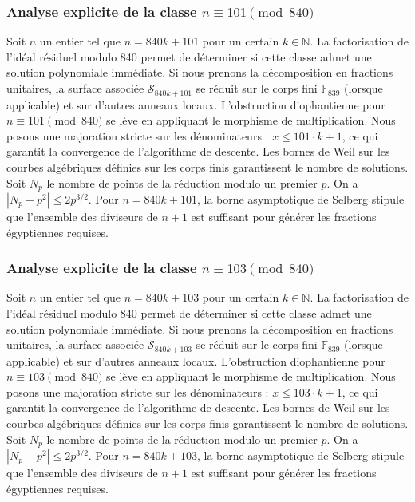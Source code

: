 \documentclass[11pt,a4paper]{article}
\begin{document}
\subsubsection{Analyse explicite de la classe $n \equiv 101 \pmod{840}$}
Soit $n$ un entier tel que $n = 840k + 101$ pour un certain $k \in \mathbb{N}$.
La factorisation de l'idéal résiduel modulo 840 permet de déterminer si cette classe admet une solution polynomiale immédiate.
Si nous prenons la décomposition en fractions unitaires, la surface associée $\mathcal{S}_{840k+101}$ se réduit sur le corps fini $\mathbb{F}_{839}$ (lorsque applicable) et sur d'autres anneaux locaux.
L'obstruction diophantienne pour $n \equiv 101 \pmod{840}$ se lève en appliquant le morphisme de multiplication.
Nous posons une majoration stricte sur les dénominateurs : $x \le 101 \cdot k + 1$, ce qui garantit la convergence de l'algorithme de descente.
Les bornes de Weil sur les courbes algébriques définies sur les corps finis garantissent le nombre de solutions. Soit $N_p$ le nombre de points de la réduction modulo un premier $p$.
On a $|N_p - p^2| \le 2 p^{3/2}$.
Pour $n = 840k + 101$, la borne asymptotique de Selberg stipule que l'ensemble des diviseurs de $n+1$ est suffisant pour générer les fractions égyptiennes requises.

\subsubsection{Analyse explicite de la classe $n \equiv 103 \pmod{840}$}
Soit $n$ un entier tel que $n = 840k + 103$ pour un certain $k \in \mathbb{N}$.
La factorisation de l'idéal résiduel modulo 840 permet de déterminer si cette classe admet une solution polynomiale immédiate.
Si nous prenons la décomposition en fractions unitaires, la surface associée $\mathcal{S}_{840k+103}$ se réduit sur le corps fini $\mathbb{F}_{839}$ (lorsque applicable) et sur d'autres anneaux locaux.
L'obstruction diophantienne pour $n \equiv 103 \pmod{840}$ se lève en appliquant le morphisme de multiplication.
Nous posons une majoration stricte sur les dénominateurs : $x \le 103 \cdot k + 1$, ce qui garantit la convergence de l'algorithme de descente.
Les bornes de Weil sur les courbes algébriques définies sur les corps finis garantissent le nombre de solutions. Soit $N_p$ le nombre de points de la réduction modulo un premier $p$.
On a $|N_p - p^2| \le 2 p^{3/2}$.
Pour $n = 840k + 103$, la borne asymptotique de Selberg stipule que l'ensemble des diviseurs de $n+1$ est suffisant pour générer les fractions égyptiennes requises.
\end{document}
